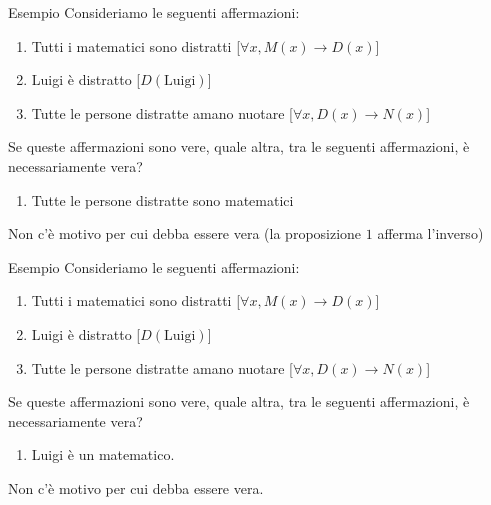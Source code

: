 \documentclass[aspectratio=169,10pt]{beamer}
\newcommand{\xmark}{{\color{red}{\ding{55}}}}
\begin{document}
\begin{frame}{Esempio}
 Consideriamo le seguenti affermazioni:
 \begin{enumerate}
\item Tutti i matematici sono distratti [\alert{$\forall x, M(x) \to D(x)$}]
\item Luigi è distratto [\alert{$D(\text{Luigi})$}]
\item Tutte le persone distratte amano nuotare [\alert{$\forall x, D(x) \to N(x)$}]
\end{enumerate}
Se queste affermazioni sono vere, quale altra, tra le seguenti affermazioni, è necessariamente vera?
\begin{enumerate}[A]\addtocounter{enumi}{2}
\item Tutte le persone distratte sono matematici  \only<3>{(\xmark)}
\end{enumerate}
\pause
\medskip
Non c'è motivo per cui debba essere vera (la proposizione $1$ afferma l'inverso)
\end{frame}

\begin{frame}{Esempio}
 Consideriamo le seguenti affermazioni:
 \begin{enumerate}
\item Tutti i matematici sono distratti [\alert{$\forall x, M(x) \to D(x)$}]
\item Luigi è distratto [\alert{$D(\text{Luigi})$}]
\item Tutte le persone distratte amano nuotare [\alert{$\forall x, D(x) \to N(x)$}]
\end{enumerate}
Se queste affermazioni sono vere, quale altra, tra le seguenti affermazioni, è necessariamente vera?
\begin{enumerate}[A]\addtocounter{enumi}{1}
\item Luigi è un matematico.  \only<3>{(\xmark)}
\end{enumerate}
\pause
\medskip
Non c'è motivo per cui debba essere vera.
\end{frame}
\end{document}
